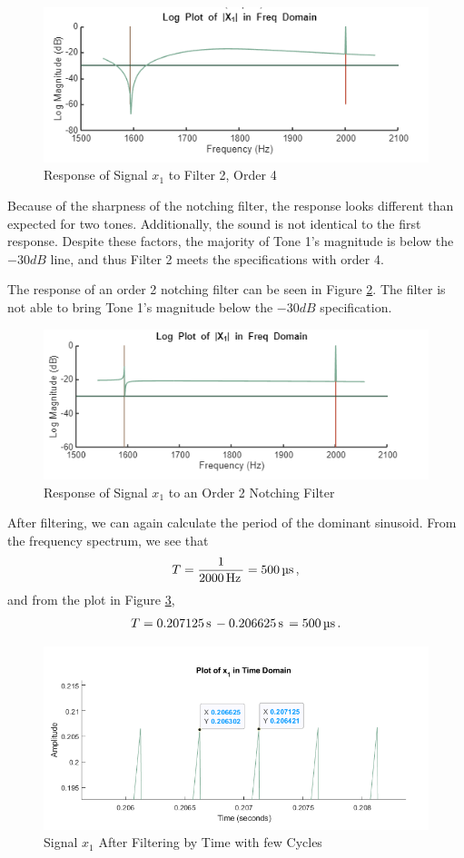\begin{figure}[H]
    \centering
    \includegraphics[width=0.5\linewidth]{figures/X1_filterv10.png}
    \caption{Response of Signal $x_1$ to Filter 2, Order 4}
    \label{fig:X1_v10}
\end{figure}

Because of the sharpness of the notching filter, the response looks different than expected for two tones.  Additionally, the sound is not identical to the first response.  Despite these factors, the majority of Tone 1's magnitude is below the $-30 \unit{dB}$ line, and thus Filter 2 meets the specifications with order 4.

The response of an order 2 notching filter can be seen in Figure \ref{fig:X1_v11}.  The filter is not able to bring Tone 1's magnitude below the $-30\unit{dB}$ specification.

\begin{figure}[H]
    \centering
    \includegraphics[width=0.5\linewidth]{figures/X1_filterv11.png}
    \caption{Response of Signal $x_1$ to an Order 2 Notching Filter}
    \label{fig:X1_v11}
\end{figure}

After filtering, we can again calculate the period of the dominant sinusoid.  From the frequency spectrum, we see that
\begin{align*}
    T = \frac{1}{2000 \, \text{Hz} \,} = 500 \, \text{$\micro$s} \,,
\end{align*}
and from the plot in Figure \ref{fig:x1_timeT2},
\begin{align*}
    T = 0.207125 \, \text{s} \, - 0.206625 \, \text{s} \, = 500 \, \text{$\micro$s} \,.
\end{align*}

\begin{figure}
    \centering
    \includegraphics[width=0.5\linewidth]{figures/x1_timeperiod2.png}
    \caption{Signal $x_1$ After Filtering by Time with few Cycles}
    \label{fig:x1_timeT2}
\end{figure}